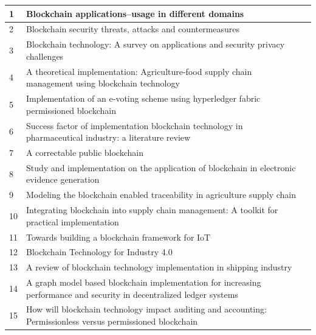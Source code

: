 \documentclass[11pt]{article}
\begin{document}
\begin{center}
\begin{tabular}{ | m{.5cm} | m{10cm}| m{1cm} | } 
  \hline
  1 & Blockchain applications–usage in different domains & \cite{abou2019blockchain} \\ 
  \hline
  2 & Blockchain security threats, attacks and countermeasures & \cite{siddiqui2020blockchain} \\ 
  \hline
  3 & Blockchain technology: A survey on applications and security privacy challenges  & \cite{mohanta2019blockchain} \\  
  \hline
  4 & A theoretical implementation: Agriculture-food supply chain management using blockchain technology  & \cite{madumidha2019theoretical} \\ 
  \hline
  5 & Implementation of an e-voting scheme using hyperledger fabric permissioned blockchain & \cite{kirillov2019implementation} \\ 
  \hline
  6 & Success factor of implementation blockchain technology in pharmaceutical industry: a literature review & \cite{fernando2019success} \\  \hline
  7 & A correctable public blockchain  & \cite{marsalek2019correctable} \\ 
  \hline
  8 & Study and implementation on the application of blockchain in electronic evidence generation & \cite{chen2020study} \\ 
  \hline
  9 & Modeling the blockchain enabled traceability in agriculture supply chain  & \cite{kamble2020modeling} \\  
  \hline
  10 & Integrating blockchain into supply chain management: A toolkit for practical implementation & \cite{waller2019integrating} \\ 
  \hline
  11 & Towards building a blockchain framework for IoT & \cite{pavithran2020towards} \\ 
  \hline
  12 & Blockchain Technology for Industry 4.0 & \cite{da2020blockchain} \\  
  \hline
  13 & A review of blockchain technology implementation in shipping industry & \cite{jovic2019review} \\ 
  \hline
  14 & A graph model based blockchain implementation for increasing performance and security in decentralized ledger systems & \cite{tsoulias2020graph} \\ 
  \hline
  15 & How will blockchain technology impact auditing and accounting: Permissionless versus permissioned blockchain & \cite{liu2019will} \\  

\end{tabular}
\end{center}
\end{document}
